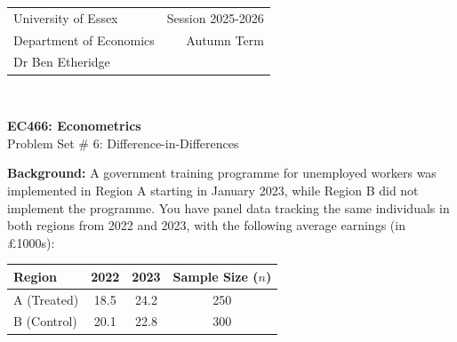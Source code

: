 \documentclass[12pt,a4paper]{article}
\begin{document}
\begin{tabular}{l r}
University of Essex  \hspace{35ex}& Session 2025-2026 \\
Department of Economics \hspace{35ex} & Autumn Term\\
Dr Ben Etheridge \hspace{35ex} &
\end{tabular}
\\
\begin{center}
\large{\textbf{EC466: Econometrics }\\
Problem Set \# 6: Difference-in-Differences}
\end{center}
\vspace*{0.5cm}

\textbf{Background:} A government training programme for unemployed workers was implemented in Region A starting in January 2023, while Region B did not implement the programme. You have panel data tracking the same individuals in both regions from 2022 and 2023, with the following average earnings (in \pounds1000s):

\vspace{1em}
\begin{center}
\begin{tabular}{lccc}
\hline
Region & 2022 & 2023 & Sample Size ($n$) \\
\hline
A (Treated) & 18.5 & 24.2 & 250 \\
B (Control) & 20.1 & 22.8 & 300 \\
\hline
\end{tabular}
\end{center}
\vspace{1em}
\end{document}
